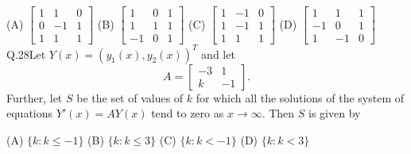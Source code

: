 \documentclass{article}
\begin{document}
																															    \newline
																															    \noindent (A) $\begin{bmatrix} 1 & 1 & 0 \\ 0 & -1 & 1 \\ 1 & 1 & 1 \end{bmatrix}$ \hspace{6.75cm} (B)  $\begin{bmatrix} 1 & 0 & 1 \\ 1 & 1 & 1 \\ -1 & 0 & 1 \end{bmatrix}$
																															    \newline \noindent (C) $\begin{bmatrix} 1 & -1 & 0 \\ 1 & -1 & 1 \\ 1 & 1 & 1 \end{bmatrix}$\hspace{6.75cm}  (D) $\begin{bmatrix} 1 & 1 & 1 \\ -1 & 0 & 1 \\ 1 & -1 & 0 \end{bmatrix}$
																															    \vspace{1em}
																															    \newline
																															    Q.28\quad Let $Y(x) = (y_1(x), y_2(x))^T$ and let
																															    \[
																															    A = \begin{bmatrix} -3 & 1 \\ k & -1 \end{bmatrix}.
																															    \]
																															    Further, let $S$ be the set of values of $k$ for which all the solutions of the system of equations $Y'(x) = A Y(x)$ tend to zero as $x \rightarrow \infty$. Then $S$ is given by

																															    \vspace{1em} 
																															    \noindent (A) $\{k : k \leq -1\}$ \hspace{6cm} (B)  $\{k : k \leq 3\}$
																															    \newline \noindent (C) $\{k : k < -1\}$ \hspace{6cm}  (D) $\{k : k < 3\}$
																															    \vspace{1em}
\end{document}
